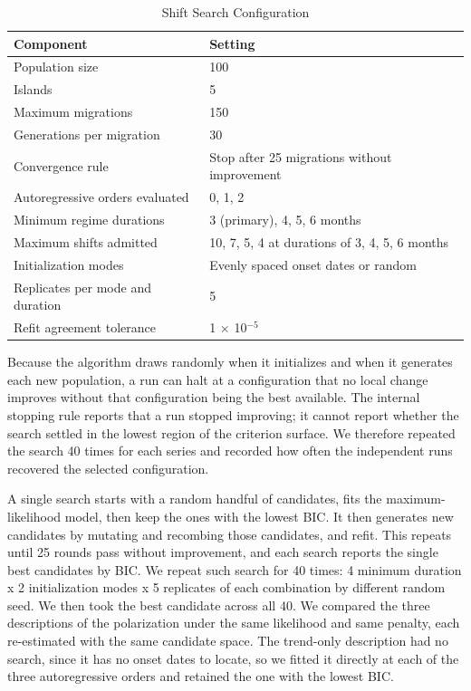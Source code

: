 \begin{table}[htbp]
\centering
\small
\begin{threeparttable}
\caption{Shift Search Configuration}
\label{tab:3}
\begin{tabularx}{\textwidth}{@{}L{0.85}L{1.15}@{}}
\toprule
\textbf{Component} & \textbf{Setting} \\
\midrule
Population size & 100 \\
Islands & 5 \\
Maximum migrations & 150 \\
Generations per migration & 30 \\
Convergence rule & Stop after 25 migrations without improvement \\
Autoregressive orders evaluated & 0, 1, 2 \\
Minimum regime durations & 3 (primary), 4, 5, 6 months \\
Maximum shifts admitted & 10, 7, 5, 4 at durations of 3, 4, 5, 6 months \\
Initialization modes & Evenly spaced onset dates or random \\
Replicates per mode and duration & 5 \\
Refit agreement tolerance & 1 $\times$ 10$^{-5}$ \\
\bottomrule
\end{tabularx}
\end{threeparttable}
\end{table}


Because the algorithm draws randomly when it initializes and when it generates each new population, a run can halt at a configuration that no local change improves without that configuration being the best available. The internal stopping rule reports that a run stopped improving; it cannot report whether the search settled in the lowest region of the criterion surface. We therefore repeated the search 40 times for each series and recorded how often the independent runs recovered the selected configuration.

A single search starts with a random handful of candidates, fits the maximum-likelihood model, then keep the ones with the lowest BIC. It then generates new candidates by mutating and recombing those candidates, and refit. This repeats until 25 rounds pass without improvement, and each search reports the single best candidates by BIC. We repeat such search for 40 times: 4 minimum duration x 2 initialization modes x 5 replicates of each combination by different random seed. We then took the best candidate across all 40. We compared the three descriptions of the polarization under the same likelihood and same penalty, each re-estimated with the same candidate space. The trend-only description had no search, since it has no onset dates to locate, so we fitted it directly at each of the three autoregressive orders and retained the one with the lowest BIC.

